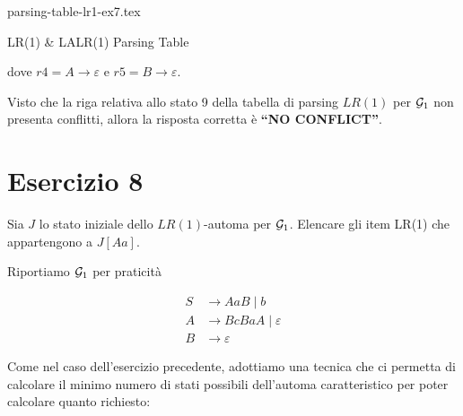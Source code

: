 \documentclass[class=book, crop=false, oneside, 12pt]{standalone}
\begin{document}
\begin{table}[H]
    \centering
    {parsing-table-lr1-ex7.tex}
    \caption{LR(1) \& LALR(1) Parsing Table}
    \label{tab:parsing-table-lr1-ex7}
\end{table}
dove \(r4 =  A \to \varepsilon\) e \(r5 =  B \to \varepsilon\).

Visto che la riga relativa allo stato 9 della tabella di parsing \(LR(1)\) per \(\mathcal{G}_1\) non presenta conflitti, allora la risposta corretta è \textbf{“NO CONFLICT”}.

\section*{Esercizio 8}

Sia \(J\) lo stato iniziale dello \(LR(1)\)-automa per \(\mathcal{G}_1\). Elencare gli item LR(1) che appartengono a \(J[Aa]\).

Riportiamo \(\mathcal{G}_1\) per praticità

\begin{align*}
    S &\to AaB \mid b \\
    A &\to BcBaA \mid \varepsilon \\
    B &\to \varepsilon
\end{align*}

Come nel caso dell'esercizio precedente, adottiamo una tecnica che ci permetta di calcolare il minimo numero di stati possibili dell'automa caratteristico per poter calcolare quanto richiesto:
\end{document}
